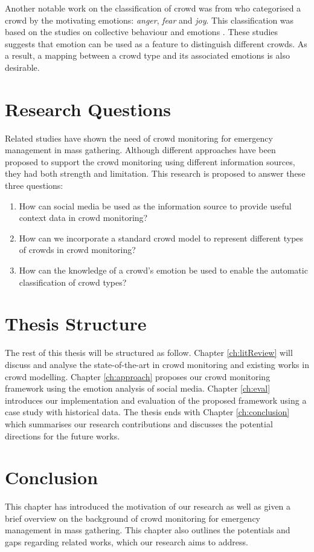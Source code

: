 Another notable work on the classification of crowd was from \textcite{Lofland1985} who categorised a crowd by the motivating emotions: \textit{anger}, \textit{fear} and \textit{joy}. This classification was based on the studies on collective behaviour and emotions \parencite{Lofland1985,Smelser1998,Brown1954}. These studies suggests that emotion can be used as a feature to distinguish different crowds. As a result, a mapping between a crowd type and its associated emotions is also desirable. 

\section{Research Questions}
Related studies have shown the need of crowd monitoring for emergency management in mass gathering. Although different approaches have been proposed to support the crowd monitoring using different information sources, they had both strength and limitation. This research is proposed to answer these three questions:
\begin{enumerate}
\item How can social media be used as the information source to provide useful context data in crowd monitoring?
\item How can we incorporate a standard crowd model to represent different types of crowds in crowd monitoring?
\item How can the knowledge of a crowd's emotion be used to enable the automatic classification of crowd types?
\end{enumerate}

\section{Thesis Structure}
The rest of this thesis will be structured as follow. Chapter \ref{ch:litReview} will discuss and analyse the state-of-the-art in crowd monitoring and existing works in crowd modelling. Chapter \ref{ch:approach} proposes our crowd monitoring framework using the emotion analysis of social media. Chapter \ref{ch:eval} introduces our implementation and evaluation of the proposed framework using a case study with historical data. The thesis ends with Chapter \ref{ch:conclusion} which summarises our research contributions and discusses the potential directions for the future works.

\section{Conclusion}
This chapter has introduced the motivation of our research as well as given a brief overview on the background of crowd monitoring for emergency management in mass gathering. This chapter also outlines the potentials and gaps regarding related works, which our research aims to address.